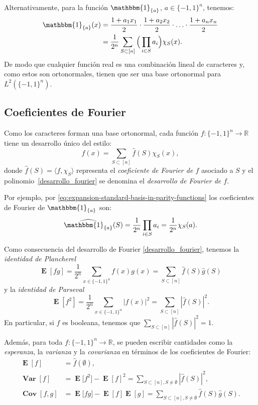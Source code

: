 \documentclass[autocontact]{gaceta}
\newcommand{\R}{\mathbb{R}}
\DeclareMathOperator{\Cov}{\mathbf{Cov}}
\DeclareMathOperator{\Var}{\mathbf{Var}}
\DeclareMathOperator{\EE}{\mathbf{E}}
\begin{document}
Alternativamente, para la función $\mathbbm{1}_{\{a\}}$, $a\in \{-1,1\}^n$, tenemos:
\begin{align}
   \mathbbm{1}_{\{a\}}(x)
   &= \frac{1+a_1x_1}{2} \cdot
   \frac{1+a_2x_2}{2} \cdot
   \ldots \cdot \frac{1+a_nx_n}{2}
   \notag
   \\
   &= \frac{1}{2^n} \sum_{S\subset [n]} \Big( \prod_{i\in S}a_i \Big) \chi_S(x). \label{eq:expansion-standard-basis-in-parity-functions}
\end{align}
De modo que cualquier función real es una combinación lineal de caracteres y, como estos son ortonormales, tienen que ser una base ortonormal para $L^2(\{-1,1\}^n)$.

\subsection{Coeficientes de Fourier}\label{sec:coeficientes-Fourier}

Como los caracteres forman una base ortonormal, cada función $f:\{-1,1\}^{n}\to \R$ tiene un desarrollo único del estilo:
\begin{equation}
\label{desarrollo_fourier}
f(x) = \sum_{S\subset [n]} \widehat{f}(S) \chi_S(x),
\end{equation}
donde $\widehat{f}(S)=\langle f,\chi_S\rangle$ representa el \emph{coeficiente de Fourier de $f$} asociado a $S$ y el polinomio~\eqref{desarrollo_fourier} se denomina el \emph{desarrollo de Fourier de $f$}.

Por ejemplo, por \eqref{eq:expansion-standard-basis-in-parity-functions} los coeficientes de Fourier de $\mathbbm{1}_{\{a\}}$ son:
\[
   \widehat{\mathbbm{1}_{\{a\}}}(S)
   = \frac{1}{2^n} \prod_{i\in S}a_i
   = \frac{1}{2^n} \chi_S(a).
\]

Como consecuencia del desarrollo de Fourier \eqref{desarrollo_fourier}, tenemos la \emph{identidad de Plancherel}
\[
   \EE[fg] = \frac{1}{2^n}\sum_{x\in \{-1,1\}^n} f(x) g(x)
   = \sum_{S\subset [n]} \widehat{f}(S) \widehat{g}(S)
\]
y la \emph{identidad de Parseval}
\begin{equation}
\label{Parseval}
   \EE[f^2] = \frac{1}{2^n} \sum_{x\in \{-1,1\}^n} |f(x)|^2
   = \sum_{S\subset [n]} |\widehat{f}(S)|^2.
\end{equation}
En particular, si $f$ es booleana, tenemos que $\sum_{S\subset [n]} |\widehat{f}(S)|^2 = 1$.

Además, para toda $f:\{-1,1\}^{n} \to \R$, se pueden escribir cantidades como la \emph{esperanza}, la \emph{varianza} y la \emph{covarianza} en términos de los coeficientes de Fourier:
\begin{align*}
   \EE[f] &=\widehat{f}(\emptyset),
   \\
   \Var[f] &=\EE\big[f^2\big] -\EE[f]^2
   =\sum_{S\subset [n], S\neq\emptyset} |\widehat{f}(S)|^2,
   \\
   \Cov[f,g] &= \EE\big[fg \big]-\EE[f] \EE[g]
   = \sum_{S\subset [n], S\neq\emptyset} \widehat{f}(S) \widehat{g}(S).
\end{align*}
\end{document}
